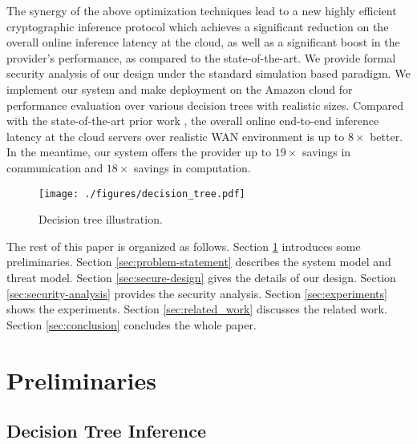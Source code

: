 \documentclass[10pt,journal,compsoc]{IEEEtran}
\begin{document}
The synergy of the above optimization techniques lead to a new highly efficient cryptographic inference protocol which achieves a significant reduction on the overall online inference latency at the cloud, as well as a significant boost in the provider's performance, as compared to the state-of-the-art.
%
We provide formal security analysis of our design under the standard simulation based paradigm.
%
We implement our system and make deployment on the Amazon cloud for performance evaluation over various decision trees with realistic sizes.
%
Compared with the state-of-the-art prior work \cite{ZhengDWWN20}, the overall online end-to-end inference latency at the cloud servers over realistic WAN environment is up to $8 \times$ better.
%
In the meantime, our system offers the provider up to $19 \times$ savings in communication and $18\times$ savings in computation.
%



\begin{figure}[t!]
\centerline{\texttt{[image: ./figures/decision\_tree.pdf]}}
\caption{Decision tree illustration.}
\label{fig:decision_tree}
\end{figure}




%
The rest of this paper is organized as follows.
%
Section \ref{sec:preliminaries} introduces some preliminaries.
%
Section \ref{sec:problem-statement} describes the system model and threat model.
%
Section \ref{sec:secure-design} gives the details of our design.
%
Section \ref{sec:security-analysis} provides the security analysis.
%
Section \ref{sec:experiments} shows the experiments.
%
Section \ref{sec:related_work} discusses the related work.
%
Section \ref{sec:conclusion} concludes the whole paper.


\section{Preliminaries}
\label{sec:preliminaries}

\subsection{Decision Tree Inference} 
\end{document}

